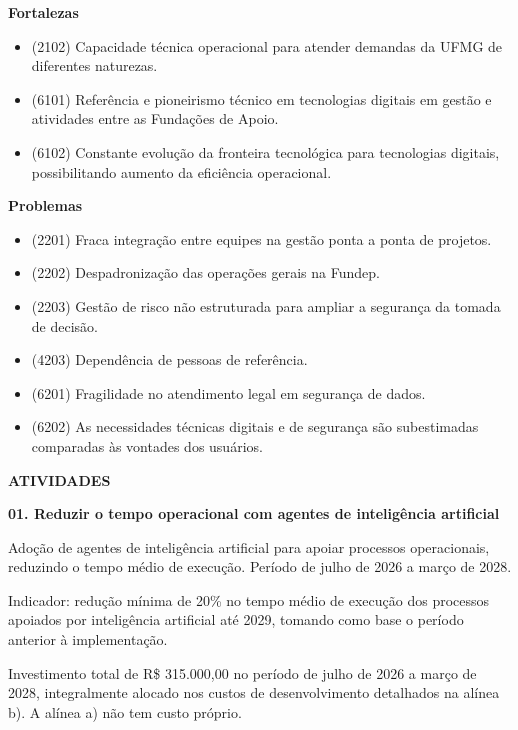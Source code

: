 \documentclass[12pt,a4paper]{article}
\newcommand{\secao}[1]{%
  \par\vspace{\dimexpr16pt-\parskip\relax}%
  {\noindent\bfseries\color{azulTitulo}\fontsize{13}{16}\selectfont #1}%
  \par\vspace{\dimexpr8pt-\parskip\relax}%
}
\newcommand{\atividade}[1]{%
  \par\vspace{\dimexpr16pt-\parskip\relax}%
  {\bfseries\color{azulAtividade}#1}%
  \par\vspace{\dimexpr8pt-\parskip\relax}%
}
\begin{document}
\textbf{Fortalezas}
\begin{itemize}[leftmargin=1.25cm,topsep=0pt,itemsep=2pt,parsep=0pt]
  \item (2102) Capacidade técnica operacional para atender demandas da UFMG de diferentes naturezas.
  \item (6101) Referência e pioneirismo técnico em tecnologias digitais em gestão e atividades entre as Fundações de Apoio.
  \item (6102) Constante evolução da fronteira tecnológica para tecnologias digitais, possibilitando aumento da eficiência operacional.
\end{itemize}

\textbf{Problemas}
\begin{itemize}[leftmargin=1.25cm,topsep=0pt,itemsep=2pt,parsep=0pt]
  \item (2201) Fraca integração entre equipes na gestão ponta a ponta de projetos.
  \item (2202) Despadronização das operações gerais na Fundep.
  \item (2203) Gestão de risco não estruturada para ampliar a segurança da tomada de decisão.
  \item (4203) Dependência de pessoas de referência.
  \item (6201) Fragilidade no atendimento legal em segurança de dados.
  \item (6202) As necessidades técnicas digitais e de segurança são subestimadas comparadas às vontades dos usuários.
\end{itemize}

\secao{ATIVIDADES}

\atividade{01. Reduzir o tempo operacional com agentes de inteligência artificial}

Adoção de agentes de inteligência artificial para apoiar processos operacionais, reduzindo o tempo médio de execução. Período de julho de 2026 a março de 2028.

Indicador: redução mínima de 20\% no tempo médio de execução dos processos apoiados por inteligência artificial até 2029, tomando como base o período anterior à implementação.

Investimento total de R\$ 315.000,00 no período de julho de 2026 a março de 2028, integralmente alocado nos custos de desenvolvimento detalhados na alínea b). A alínea a) não tem custo próprio.
\end{document}
